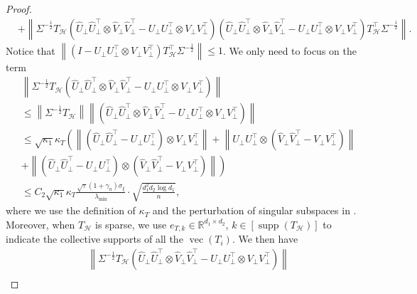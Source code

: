 \documentclass[12pt]{article}
\newcommand{\norm}[1]{\left\lVert#1\right\rVert}
\newcommand{\R}{\mathbb{R}}
\def\calH{{\mathcal H}}
\theoremstyle{plain}
\begin{document}
\begin{proof}
\begin{equation*}
\begin{aligned}
      &+  \norm{\Sigma^{-\frac{1}{2}}T_{\calH}\left(\widehat U_\perp \widehat U_\perp^\top \otimes \widehat V_\perp \widehat V_\perp^\top - U_\perp U_\perp^\top \otimes V_\perp V_\perp^\top\right) \left(\widehat U_\perp \widehat U_\perp^\top \otimes \widehat V_\perp \widehat V_\perp^\top - U_\perp U_\perp^\top \otimes V_\perp V_\perp^\top\right) T_{\calH}^\top \Sigma^{-\frac{1}{2}}}.
    \end{aligned}
\end{equation*}
Notice that $\norm{\left(I-U_\perp U_\perp^\top \otimes V_\perp V_\perp^\top\right) T_{\calH}^\top \Sigma^{-\frac{1}{2}}}\le 1$. We only need to focus on the term
\begin{equation*}
    \begin{aligned}
      &\norm{\Sigma^{-\frac{1}{2}}T_{\calH}\left(\widehat U_\perp \widehat U_\perp^\top \otimes \widehat V_\perp \widehat V_\perp^\top - U_\perp U_\perp^\top \otimes V_\perp V_\perp^\top\right)}  \\
      & \le  \norm{\Sigma^{-\frac{1}{2}} T_{\calH} }\norm{\left(\widehat U_\perp \widehat U_\perp^\top \otimes \widehat V_\perp \widehat V_\perp^\top - U_\perp U_\perp^\top \otimes V_\perp V_\perp^\top\right)} \\
      & \le \sqrt{\kappa_1}\kappa_T\left( \norm{ \left(\widehat U_\perp \widehat U_\perp^\top -U_\perp U_\perp^\top \right)\otimes V_\perp V_\perp^\top} +\norm{U_\perp U_\perp^\top \otimes \left( \widehat V_\perp \widehat V_\perp^\top-V_\perp V_\perp^\top\right) }\right. \\
      & + \left.\norm{ \left(\widehat U_\perp \widehat U_\perp^\top -U_\perp U_\perp^\top \right)\otimes \left( \widehat V_\perp \widehat V_\perp^\top-V_\perp V_\perp^\top\right)}\right)\\
      & \le C_2 \sqrt{\kappa_1}\kappa_T \frac{\sqrt{\tau}\left(1+\gamma_{n}\right) \sigma_{\xi}}{\lambda_{\min}} \cdot \sqrt{\frac{d_1^2 d_2 \log d_1}{n}},  
    \end{aligned}
\end{equation*}
where we use the definition of $\kappa_T$ and the perturbation of singular subspaces in \cite{xia2021statistical}. Moreover, when $T_{\calH}$ is sparse, we use $e_{T, k}\in \R^{d_1\times d_2} $, $k\in[\operatorname{supp}(T_{\calH} ) ]$ to indicate the collective supports of  all the $\operatorname{vec}(T_i)$. We then have
\begin{equation}\label{eq:sparse-T}
    \begin{aligned}
      &\norm{\Sigma^{-\frac{1}{2}}T_{\calH}\left(\widehat U_\perp \widehat U_\perp^\top \otimes \widehat V_\perp \widehat V_\perp^\top - U_\perp U_\perp^\top \otimes V_\perp V_\perp^\top\right)}  \\

\end{aligned}
\end{equation}
\end{proof}
\end{document}
